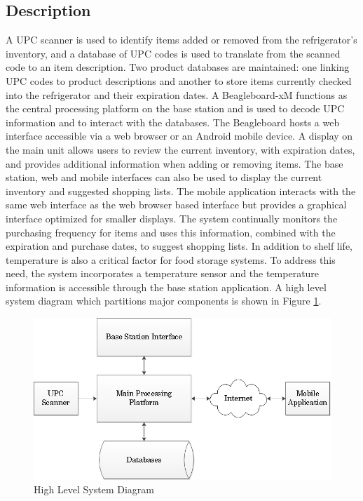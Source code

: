 \documentclass[11pt]{article} %
\begin{document}
\subsection{Description}
A UPC scanner is used to identify items added or removed from the refrigerator's inventory, and a database of UPC codes is used to translate from the scanned code to an item description. Two product databases are maintained: one linking UPC codes to product descriptions and another to store items currently checked into the refrigerator and their expiration dates. A Beagleboard-xM functions as the central processing platform on the base station and is used to decode UPC information and to interact with the databases. The Beagleboard hosts a web interface accessible via a web browser or an Android mobile device. A display on the main unit allows users to review the current inventory, with expiration dates, and provides additional information when adding or removing items. The base station, web and mobile interfaces can also be used to display the current inventory and suggested shopping lists. The mobile application interacts with the same web interface as the web browser based interface but provides a graphical interface optimized for smaller displays. The system continually monitors the purchasing frequency for items and uses this information, combined with the expiration and purchase dates, to suggest shopping lists. In addition to shelf life, temperature is also a critical factor for food storage systems. To address this need, the system incorporates a temperature sensor and the temperature information is accessible through the base station application.
\newline \quad \newline
A high level system diagram which partitions major components is shown in Figure \ref{fig:sysdiag}.
\begin{figure}[h]
\begin{center}
\vspace{0.5cm}
\includegraphics[scale=0.5]{../graphics/HighestLevelDiagram}
\caption{High Level System Diagram}
\label{fig:sysdiag}
\end{center}
\end{figure}
\pagebreak
\end{document}

